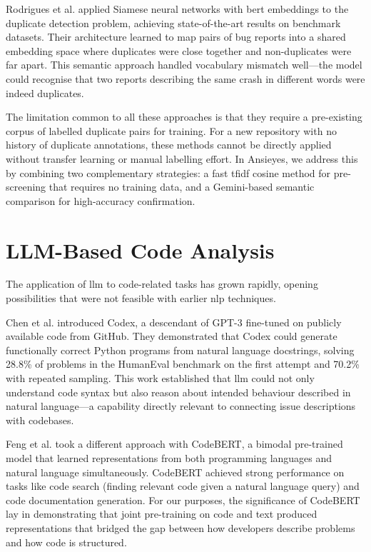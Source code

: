 Rodrigues et al. \cite{Rodrigues2020} applied Siamese neural networks with \gls{bert} embeddings to the duplicate detection problem, achieving state-of-the-art results on benchmark datasets. Their architecture learned to map pairs of bug reports into a shared embedding space where duplicates were close together and non-duplicates were far apart. This semantic approach handled vocabulary mismatch well---the model could recognise that two reports describing the same crash in different words were indeed duplicates.

The limitation common to all these approaches is that they require a pre-existing corpus of labelled duplicate pairs for training. For a new repository with no history of duplicate annotations, these methods cannot be directly applied without transfer learning or manual labelling effort. In Ansieyes, we address this by combining two complementary strategies: a fast \gls{tfidf} cosine method for pre-screening that requires no training data, and a Gemini-based semantic comparison for high-accuracy confirmation.

\section{\textbf{LLM-Based Code Analysis}}

The application of \gls{llm} to code-related tasks has grown rapidly, opening possibilities that were not feasible with earlier \gls{nlp} techniques.

Chen et al. \cite{Chen2021} introduced Codex, a descendant of GPT-3 fine-tuned on publicly available code from GitHub. They demonstrated that Codex could generate functionally correct Python programs from natural language docstrings, solving 28.8\% of problems in the HumanEval benchmark on the first attempt and 70.2\% with repeated sampling. This work established that \gls{llm} could not only understand code syntax but also reason about intended behaviour described in natural language---a capability directly relevant to connecting issue descriptions with codebases.

Feng et al. \cite{Feng2020} took a different approach with CodeBERT, a bimodal pre-trained model that learned representations from both programming languages and natural language simultaneously. CodeBERT achieved strong performance on tasks like code search (finding relevant code given a natural language query) and code documentation generation. For our purposes, the significance of CodeBERT lay in demonstrating that joint pre-training on code and text produced representations that bridged the gap between how developers describe problems and how code is structured.

